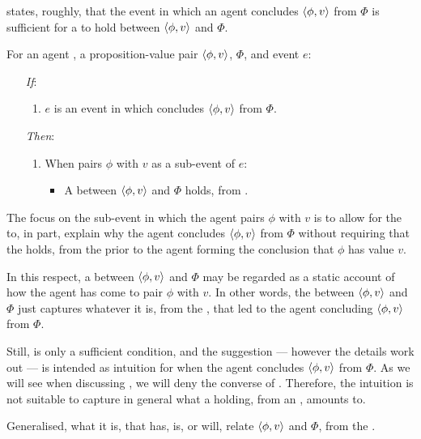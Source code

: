 \begin{note}
  \supportI{} states, roughly, that the event in which an agent concludes \(\langle \phi, v \rangle\) from \(\Phi\) is sufficient for a \ros{} to hold between \(\langle \phi, v \rangle\) and \(\Phi\).

  \begin{idea}[\supportI{}]
    \label{idea:support}
    For an agent \vAgent{}, a proposition-value pair \(\langle \phi, v \rangle\), \poP{} \(\Phi\), and event \(e\):

    \begin{itemize}
    \item[\emph{If}:]
      \begin{enumerate}[label=\alph*., ref=(\alph*)]
      \item
        \(e\) is an event in which \vAgent{} concludes \(\langle \phi, v \rangle\) from \(\Phi\).
      \end{enumerate}
    \item[\emph{Then}:]
      \begin{enumerate}[label=\alph*., ref=(\alph*), resume]
      \item
        When \vAgent{} pairs \(\phi\) with \(v\) as a sub-event of \(e\):
        \begin{itemize}
        \item
          A \emph{\ros{}} between \(\langle \phi, v \rangle\) and \(\Phi\) holds, from .
        \end{itemize}
      \end{enumerate}
    \end{itemize}
    \vspace{-\baselineskip}
  \end{idea}

  The focus on the sub-event in which the agent pairs \(\phi\) with \(v\) is to allow for the \ros{} to, in part, explain why the agent concludes \(\langle \phi, v \rangle\) from \(\Phi\) without requiring that the \ros{} holds, from the \agpe{} prior to the agent forming the conclusion that \(\phi\) has value \(v\).

  In this respect, a \ros{} between \(\langle \phi, v \rangle\) and \(\Phi\) may be regarded as a static account of how the agent has come to pair \(\phi\) with \(v\).
  In other words, the \ros{} between \(\langle \phi, v \rangle\) and \(\Phi\) just captures whatever it is, from the \agpe{}, that led to the agent concluding \(\langle \phi, v \rangle\) from \(\Phi\).

  Still, \supportI{} is only a sufficient condition, and the suggestion --- however the details work out --- is intended as intuition for when the agent concludes \(\langle \phi, v \rangle\) from \(\Phi\).
  As we will see when discussing \supportII{}, we will deny the converse of \supportI{}.
  Therefore, the intuition is not suitable to capture in general what a \ros{} holding, from an \agpe{}, amounts to.

  Generalised, what it is, that has, is, or will, relate \(\langle \phi, v \rangle\) and \(\Phi\), from the \agpe{}.
\end{note}

